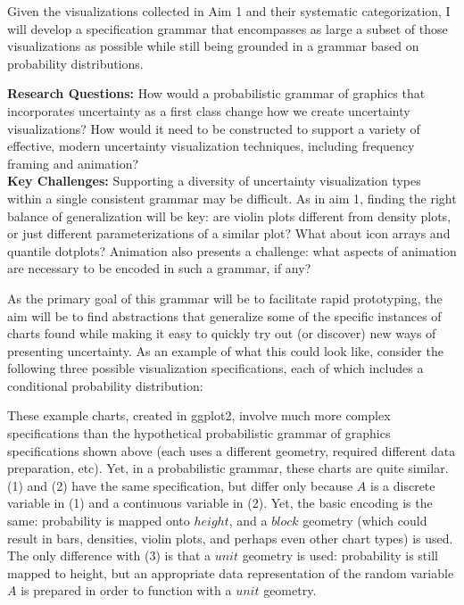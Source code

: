\documentclass[11pt]{article}
\begin{document}
\noindent Given the visualizations collected in Aim 1 and their systematic categorization, I will develop a specification grammar that encompasses as large a subset of those visualizations as possible while still being grounded in a grammar based on probability distributions. 

\noindent\hrulefill
\vspace{-0.5em}

\noindent\textbf{Research Questions:}
How would a probabilistic grammar of graphics that incorporates uncertainty as a first class change how we create uncertainty visualizations? How would it need to be constructed to support a variety of effective, modern uncertainty visualization techniques, including frequency framing and animation?
\\
\noindent\textbf{Key Challenges:}
Supporting a diversity of uncertainty visualization types within a single consistent grammar may be difficult. As in aim 1, finding the right balance of generalization will be key: are violin plots \cite{correll2014error} different from density plots, or just different parameterizations of a similar plot? What about icon arrays and quantile dotplots? Animation also presents a challenge: what aspects of animation are necessary to be encoded in such a grammar, if any?

\vspace{-1.0em}
\noindent\hrulefill

\noindent As the primary goal of this grammar will be to facilitate rapid prototyping, the aim will be to find abstractions that generalize some of the specific instances of charts found while making it easy to quickly try out (or discover) new ways of presenting uncertainty. As an example of what this could look like, consider the following three possible visualization specifications, each of which includes a conditional probability distribution:

\figprobgg

\figboys

These example charts, created in ggplot2, involve much more complex specifications than the hypothetical probabilistic grammar of graphics specifications shown above (each uses a different geometry, required different data preparation, etc). Yet, in a probabilistic grammar, these charts are quite similar. (1) and (2) have the same specification, but differ only because $A$ is a discrete variable in (1) and a continuous variable in (2). Yet, the basic encoding is the same: probability is mapped onto $height$, and a $block$ geometry (which could result in bars, densities, violin plots, and perhaps even other chart types) is used. The only difference with (3) is that a $unit$ geometry is used: probability is still mapped to height, but an appropriate data representation of the random variable $A$ is prepared in order to function with a $unit$ geometry.
\end{document}
